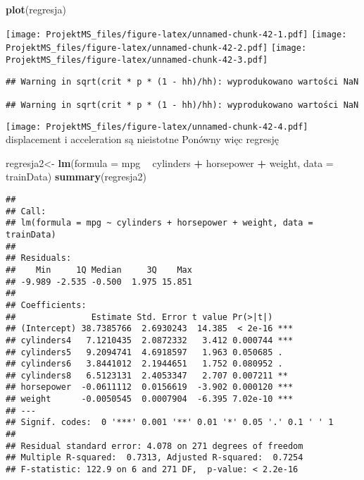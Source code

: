 \documentclass[
]{article}
\newenvironment{Shaded}{\begin{snugshade}}{\end{snugshade}}
\newcommand{\DataTypeTok}[1]{\textcolor[rgb]{0.13,0.29,0.53}{#1}}
\newcommand{\KeywordTok}[1]{\textcolor[rgb]{0.13,0.29,0.53}{\textbf{#1}}}
\newcommand{\NormalTok}[1]{#1}
\newcommand{\OperatorTok}[1]{\textcolor[rgb]{0.81,0.36,0.00}{\textbf{#1}}}
\newcommand{\StringTok}[1]{\textcolor[rgb]{0.31,0.60,0.02}{#1}}
\begin{document}
\begin{Shaded}
\begin{Highlighting}[]
\KeywordTok{plot}\NormalTok{(regresja)}
\end{Highlighting}
\end{Shaded}

\texttt{[image: ProjektMS\_files/figure-latex/unnamed-chunk-42-1.pdf]}
\texttt{[image: ProjektMS\_files/figure-latex/unnamed-chunk-42-2.pdf]}
\texttt{[image: ProjektMS\_files/figure-latex/unnamed-chunk-42-3.pdf]}

\begin{verbatim}
## Warning in sqrt(crit * p * (1 - hh)/hh): wyprodukowano wartości NaN

## Warning in sqrt(crit * p * (1 - hh)/hh): wyprodukowano wartości NaN
\end{verbatim}

\texttt{[image: ProjektMS\_files/figure-latex/unnamed-chunk-42-4.pdf]}
displacement i acceleration są nieistotne Ponówny więc regresję

\begin{Shaded}
\begin{Highlighting}[]
\NormalTok{regresja2<-}\StringTok{ }\KeywordTok{lm}\NormalTok{(}\DataTypeTok{formula =}\NormalTok{ mpg }\OperatorTok{~}\StringTok{ }\NormalTok{cylinders }\OperatorTok{+}\StringTok{ }\NormalTok{horsepower }\OperatorTok{+}\StringTok{ }\NormalTok{weight, }\DataTypeTok{data =}\NormalTok{ trainData)}
\KeywordTok{summary}\NormalTok{(regresja2)}
\end{Highlighting}
\end{Shaded}

\begin{verbatim}
## 
## Call:
## lm(formula = mpg ~ cylinders + horsepower + weight, data = trainData)
## 
## Residuals:
##    Min     1Q Median     3Q    Max 
## -9.989 -2.535 -0.500  1.975 15.851 
## 
## Coefficients:
##               Estimate Std. Error t value Pr(>|t|)    
## (Intercept) 38.7385766  2.6930243  14.385  < 2e-16 ***
## cylinders4   7.1210435  2.0872332   3.412 0.000744 ***
## cylinders5   9.2094741  4.6918597   1.963 0.050685 .  
## cylinders6   3.8441012  2.1944651   1.752 0.080952 .  
## cylinders8   6.5123131  2.4053347   2.707 0.007211 ** 
## horsepower  -0.0611112  0.0156619  -3.902 0.000120 ***
## weight      -0.0050545  0.0007904  -6.395 7.02e-10 ***
## ---
## Signif. codes:  0 '***' 0.001 '**' 0.01 '*' 0.05 '.' 0.1 ' ' 1
## 
## Residual standard error: 4.078 on 271 degrees of freedom
## Multiple R-squared:  0.7313, Adjusted R-squared:  0.7254 
## F-statistic: 122.9 on 6 and 271 DF,  p-value: < 2.2e-16
\end{verbatim}
\end{document}

